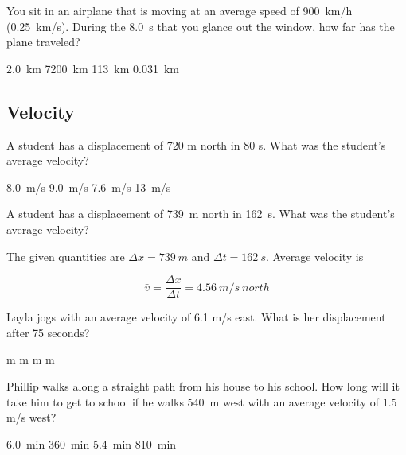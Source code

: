 \documentclass[answers]{exam}
\begin{document}
\begin{questions}
\begin{questions}
\question %
You sit in an airplane that is moving at an average speed of 
\SI{900}{km/h} (\SI{0.25}{km/s}). During the \SI{8.0}{s}
that you glance out the window, how far has the plane traveled?

\begin{choices}
\CorrectChoice \SI{2.0}{km}
\choice \SI{7200}{km}
\choice \SI{113}{km}
\choice \SI{0.031}{km}
\end{choices}


\subsection*{Velocity}
\question %
A student has a displacement of 720 m north in 80 s. What was the student's average velocity?

\begin{choices}
\choice \SI{8.0}{m/s}
\CorrectChoice \SI{9.0}{m/s}
\choice \SI{7.6}{m/s}
\choice \SI{13}{m/s}
\end{choices}


\question
A student has a displacement of \SI{739}{m} north in \SI{162}{s}. What was the student's average velocity?

\begin{solution}
    The given quantities are $\Delta{x} = \SI{739}{m}$ and $\Delta{t} = \SI{162}{s}$. Average velocity is

\begin{equation*}
        \bar{v} = \frac{\Delta{x}}{\Delta{t}} = \SI{4.56}{m/s\ north}
\end{equation*}
\end{solution}



\question %
Layla jogs with an average velocity of 6.1 m/s east. What is her displacement after 75 seconds?

\begin{choices}
 m
 m
 m
 m
\end{choices}


\question %
Phillip walks along a straight path from his house to his school. How long will it take him to get to school if he walks \SI{540}{m} west with an average velocity of 1.5 m/s west?

\begin{choices}
\CorrectChoice \SI{6.0}{min}
\choice \SI{360}{min}
\choice \SI{5.4}{min}
\choice \SI{810}{min}



\end{choices}
\end{questions}
\end{questions}
\end{document}
